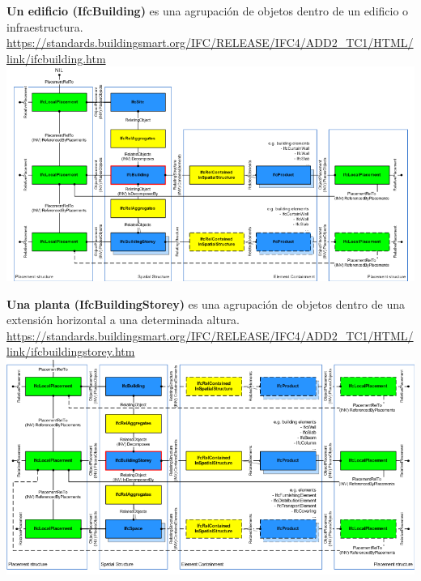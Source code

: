 \documentclass[spanish,12pt,a4paper,final,oneside]{book}
\begin{document}
\textbf{Un edificio (IfcBuilding)} es una agrupación de objetos dentro de un edificio o infraestructura.
\\ \url{https://standards.buildingsmart.org/IFC/RELEASE/IFC4/ADD2_TC1/HTML/link/ifcbuilding.htm}
\\ \includegraphics[width=\textwidth]{principales relaciones de IfcBuilding}

\vspace{1cm}
 
\textbf{Una planta (IfcBuildingStorey)} es una agrupación de objetos dentro de una extensión horizontal a una determinada altura.
\\ \url{https://standards.buildingsmart.org/IFC/RELEASE/IFC4/ADD2_TC1/HTML/link/ifcbuildingstorey.htm}
\\ \includegraphics[width=\textwidth]{principales relaciones de IfcBuildingStorey}
\end{document}
